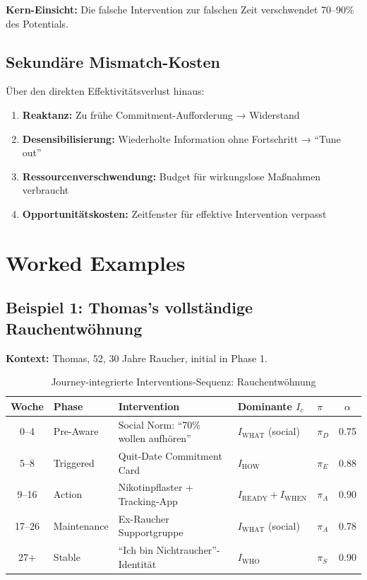 \textbf{Kern-Einsicht:} Die falsche Intervention zur falschen Zeit verschwendet 70--90\% des Potentials.

\subsection{Sekundäre Mismatch-Kosten}

Über den direkten Effektivitätsverlust hinaus:
\begin{enumerate}
\item \textbf{Reaktanz:} Zu frühe Commitment-Aufforderung → Widerstand
\item \textbf{Desensibilisierung:} Wiederholte Information ohne Fortschritt → ``Tune out''
\item \textbf{Ressourcenverschwendung:} Budget für wirkungslose Maßnahmen verbraucht
\item \textbf{Opportunitätskosten:} Zeitfenster für effektive Intervention verpasst
\end{enumerate}


\section{Worked Examples}
\label{sec:18-examples}

\subsection{Beispiel 1: Thomas's vollständige Rauchentwöhnung}

\textbf{Kontext:} Thomas, 52, 30 Jahre Raucher, initial in Phase 1.

\begin{table}[htbp]
\centering
\caption{Journey-integrierte Interventions-Sequenz: Rauchentwöhnung}
\label{tab:18-example-thomas}
\renewcommand{\arraystretch}{1.3}
\small
\begin{tabular}{@{}cllllc@{}}
\toprule
\textbf{Woche} & \textbf{Phase} & \textbf{Intervention} & \textbf{Dominante $I_c$} & \textbf{$\pi$} & \textbf{$\alpha$} \\
\midrule
0--4 & Pre-Aware & Social Norm: ``70\% wollen aufh\"{o}ren'' & $I_{\text{WHAT}}$ (social) & $\pi_D$ & 0.75 \\
5--8 & Triggered & Quit-Date Commitment Card & $I_{\text{HOW}}$ & $\pi_E$ & 0.88 \\
9--16 & Action & Nikotinpflaster + Tracking-App & $I_{\text{READY}} + I_{\text{WHEN}}$ & $\pi_A$ & 0.90 \\
17--26 & Maintenance & Ex-Raucher Supportgruppe & $I_{\text{WHAT}}$ (social) & $\pi_A$ & 0.78 \\
27+ & Stable & ``Ich bin Nichtraucher''-Identit\"{a}t & $I_{\text{WHO}}$ & $\pi_S$ & 0.90 \\
\bottomrule
\end{tabular}
\end{table}

